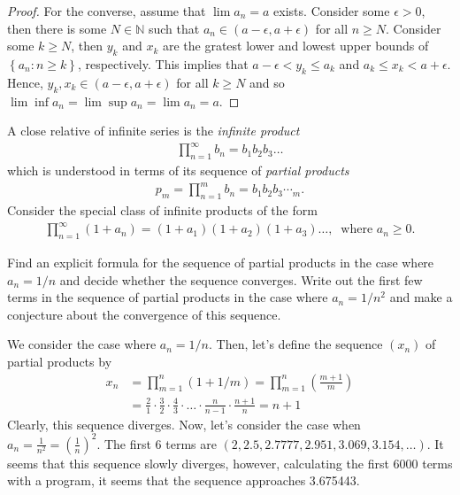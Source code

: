 \documentclass[12pt]{article}
\newcommand{\N}{\mathbb{N}}
\newenvironment{problem}[2][Problem]{\begin{trivlist} \item[\hskip \labelsep {\bfseries #1}\hskip \labelsep {\bfseries #2.}]}{\end{trivlist}}
\newenvironment{solution}[1][Solution]{\begin{trivlist} \item[\hskip \labelsep {\bfseries #1}]}{\end{trivlist}}
\begin{document}
\begin{problem}{2.4.7 (Limit Superior)}
\begin{enumerate}
\begin{proof}
  For the converse, assume that $\lim a_{n} = a$ exists. Consider some $\epsilon >0$, then there is some $N\in \N$ such that  $a_{n} \in (a-\epsilon, a+\epsilon)$ for all $n\geq N$. Consider some $k\geq N$, then $y_{k}$ and $x_{k}$ are the gratest lower and lowest upper bounds of $\left\{ a_{n}:n\geq k \right\}$, respectively. This implies that $a-\epsilon < y_{k} \leq a_{k}$ and $a_{k} \leq x_{k} < a+\epsilon$. Hence, $y_{k},x_{k}\in \left( a-\epsilon, a+\epsilon \right)$ for all $k\geq N$ and so $\lim\inf a_{n} = \lim\sup a_{n} = \lim a_{n} = a$.
\end{proof}
\end{enumerate}
\end{problem}
\begin{problem}{2.4.10 (Infinite Products)}
  A close relative of infinite series is the \textit{infinite product}
\begin{align*}
  \prod_{n=1}^{\infty} b_{n} = b_{1}b_{2}b_{3}\dots
\end{align*}
which is understood in terms of its sequence of \textit{partial products}
\begin{align*}
  p_{m} = \prod_{n=1}^{m}b_{n} = b_{1}b_{2}b_{3}\dotsb_{m}.
\end{align*}
Consider the special class of infinite products of the form
\begin{align*}
  \prod_{n=1}^{\infty}(1+a_{n}) = (1+a_{1})(1+a_{2})(1+a_{3})\dots, \: \text{ where }a_{n}\geq 0.
\end{align*}
\begin{enumerate}
  \item Find an explicit formula for the sequence of partial products in the case where $a_{n} = 1/n$ and decide whether the sequence converges. Write out the first few terms in the sequence of partial products in the case where $a_{n} = 1/n^{2}$ and make a conjecture about the convergence of this sequence.
\begin{solution}
  We consider the case where $a_{n} = 1/n$. Then, let's define the sequence $(x_{n})$ of partial products by  
\begin{align*}
  x_{n} &= \prod_{m=1}^{n} (1+1/m) = \prod_{m=1}^{n}\left( \frac{m+1}{m} \right)\\
  &= \frac{2}{1}\cdot \frac{3}{2}\cdot \frac{4}{3}\cdot \dots\cdot \frac{n}{n-1}\cdot \frac{n+1}{n} = n+1
\end{align*}
Clearly, this sequence diverges. Now, let's consider the case when $a_{n} = \frac{1}{n^{2}} = \left( \frac{1}{n} \right)^{2}$. The first 6 terms are $(2,2.5,2.7777,2.951,3.069, 3.154,\dots)$. It seems that this sequence slowly diverges, however, calculating the first 6000 terms with a program, it seems that the sequence approaches 3.675443. \\


\end{solution}
\end{enumerate}
\end{problem}
\end{document}
